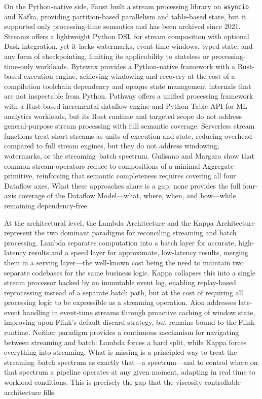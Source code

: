 \documentclass[conference]{IEEEtran}
\begin{document}
On the Python-native side, Faust \cite{faust2018} built a stream processing library on \texttt{asyncio} and Kafka, providing partition-based parallelism and table-based state, but it supported only processing-time semantics and has been archived since 2021. Streamz \cite{streamz2019} offers a lightweight Python DSL for stream composition with optional Dask integration, yet it lacks watermarks, event-time windows, typed state, and any form of checkpointing, limiting its applicability to stateless or processing-time-only workloads. Bytewax \cite{bytewax2022} provides a Python-native framework with a Rust-based execution engine, achieving windowing and recovery at the cost of a compilation toolchain dependency and opaque state management internals that are not inspectable from Python. Pathway \cite{bartoszkiewicz2023pathway} offers a unified processing framework with a Rust-based incremental dataflow engine and Python Table API for ML-analytics workloads, but its Rust runtime and targeted scope do not address general-purpose stream processing with full semantic coverage. Serverless stream functions \cite{carl2026serverless} treat short streams as units of execution and state, reducing overhead compared to full stream engines, but they do not address windowing, watermarks, or the streaming--batch spectrum. Gulisano and Margara \cite{gulisano2023semantic} show that common stream operators reduce to compositions of a minimal Aggregate primitive, reinforcing that semantic completeness requires covering all four Dataflow axes. What these approaches share is a gap: none provides the full four-axis coverage of the Dataflow Model---what, where, when, and how---while remaining dependency-free.

At the architectural level, the Lambda Architecture and the Kappa Architecture represent the two dominant paradigms for reconciling streaming and batch processing. Lambda separates computation into a batch layer for accurate, high-latency results and a speed layer for approximate, low-latency results, merging them in a serving layer---the well-known cost being the need to maintain two separate codebases for the same business logic. Kappa collapses this into a single stream processor backed by an immutable event log, enabling replay-based reprocessing instead of a separate batch path, but at the cost of requiring all processing logic to be expressible as a streaming operation. Aion \cite{esteves2020aion} addresses late-event handling in event-time streams through proactive caching of window state, improving upon Flink's default discard strategy, but remains bound to the Flink runtime. Neither paradigm provides a continuous mechanism for navigating between streaming and batch: Lambda forces a hard split, while Kappa forces everything into streaming. What is missing is a principled way to treat the streaming--batch spectrum as exactly that---a spectrum---and to control where on that spectrum a pipeline operates at any given moment, adapting in real time to workload conditions. This is precisely the gap that the viscosity-controllable architecture fills.
\end{document}

